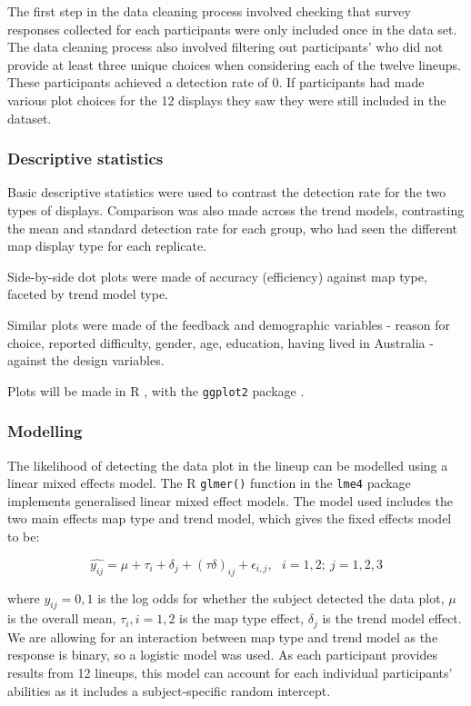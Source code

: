 \documentclass{monashthesis}
\begin{document}
The first step in the data cleaning process involved checking that survey responses collected for each participants were only included once in the data set.
The data cleaning process also involved filtering out participants' who did not provide at least three unique choices when considering each of the twelve lineups. These participants achieved a detection rate of 0. If participants had made various plot choices for the 12 displays they saw they were still included in the dataset.

\hypertarget{descriptive-statistics}{%
\subsubsection{Descriptive statistics}\label{descriptive-statistics}}

Basic descriptive statistics were used to contrast the detection rate for the two types of displays. Comparison was also made across the trend models, contrasting the mean and standard detection rate for each group, who had seen the different map display type for each replicate.

Side-by-side dot plots were made of accuracy (efficiency) against map type, faceted by trend model type.

Similar plots were made of the feedback and demographic variables - reason for choice, reported difficulty, gender, age, education, having lived in Australia - against the design variables.

Plots will be made in R \autocite{R}, with the \texttt{ggplot2} package \autocite{ggplot2}.

\hypertarget{modelling}{%
\subsubsection{Modelling}\label{modelling}}

The likelihood of detecting the data plot in the lineup can be modelled using a linear mixed effects model.
The R \autocite{R} \texttt{glmer()} function in the \texttt{lme4} \autocite{lme4} package implements generalised linear mixed effect models. The model used includes the two main effects map type and trend model, which gives the fixed effects model to be:

\[\widehat{y_{ij}} = \mu + \tau_i + \delta_j + (\tau\delta)_{ij} + \epsilon_{i,j}, ~~~ i=1,2; ~j=1,2,3\]

where \(y_{ij} = 0, 1\) is the log odds for whether the subject detected the data plot, \(\mu\) is the overall mean, \(\tau_i, i=1,2\) is the map type effect, \(\delta_j\) is the trend model effect. We are allowing for an interaction between map type and trend model as the response is binary, so a logistic model was used. As each participant provides results from 12 lineups, this model can account for each individual participants' abilities as it includes a subject-specific random intercept.
\end{document}
